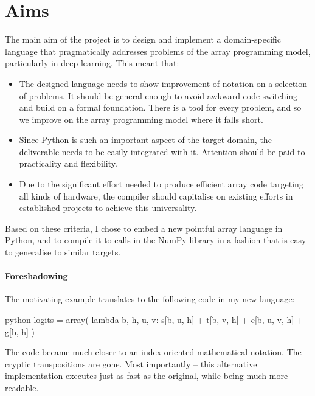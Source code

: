 \section{Aims}

The main aim of the project is to design and implement a domain-specific language that pragmatically addresses problems of the array programming model, particularly in deep learning. This meant that:
\begin{itemize}
    \item The designed language needs to show improvement of notation on a selection of problems. It should be general enough to avoid awkward code switching and build on a formal foundation. There is a tool for every problem, and so we improve on the array programming model where it falls short. 
    \item Since Python is such an important aspect of the target domain, the deliverable needs to be easily integrated with it. Attention should be paid to practicality and flexibility.
    \item Due to the significant effort needed to produce efficient array code targeting all kinds of hardware, the compiler should capitalise on existing efforts in established projects to achieve this universality.
\end{itemize}
Based on these criteria, I chose to embed a new pointful array language in Python, and to compile it to calls in the NumPy library in a fashion that is easy to generalise to similar targets. 

\paragraph{Foreshadowing} The motivating example translates to the following code in my new language:
\begin{center}
\begin{cminted}{python}
logits = array(
    lambda b, h, u, v: s[b, u, h] + t[b, v, h] + e[b, u, v, h] + g[b, h]
)
\end{cminted}
\end{center}
The code became much closer to an index-oriented mathematical notation. The cryptic transpositions are gone. Most importantly -- this alternative implementation executes just as fast as the original, while being much more readable.
